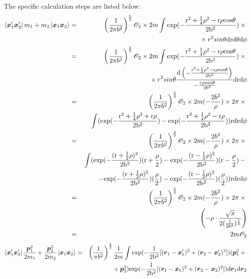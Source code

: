 \documentclass[11pt]{article}
\newcommand{\bm}[1]{\mbox{\boldmath{$#1$}}}
\begin{document}
\begin{enumerate}
\begin{enumerate}
The specific calculation steps are listed below:
\begin{eqnarray}
\bra{\bm{x}_{1}^\prime\bm{x}_{2}^\prime}m_{1}+m_{2}\ket{\bm{x}_{1}\bm{x}_{2}}&=&\left(\frac{1}{2\pi{}b^2}\right)^{\frac{3}{2}}
\mathscr{O}_2\times{}2m\int\rm{exp}(-\frac{r^2+\frac{1}{4}\rho^2-r{}\rho{}cos\theta}{2b^2})\times{}\nonumber\\
&&{}\times{}r^2sin\theta\rm{d}r\rm{d}\theta\rm{d}\phi\nonumber\\
&=&\left(\frac{1}{2\pi{}b^2}\right)^{\frac{3}{2}}\mathscr{O}_2\times{}2m
\int\rm{exp}(-\frac{r^2+\frac{1}{4}\rho^2-r{}\rho{}cos\theta}{2b^2})\times{}\nonumber\\
&&{}\times{}r^2sin\theta\frac{\rm{d}\left(-\frac{r^2+\frac{1}{4}\rho^2-r{}\rho{}cos\theta}{2b^2}\right)}
{-\frac{r{}\rho{}sin\theta}{2b^2}}
\rm{d}r\rm{d}\phi\nonumber\\
&=&\left(\frac{1}{2\pi{}b^2}\right)^{\frac{3}{2}}\mathscr{O}_2\times{}2m(-\frac{2b^2}{\rho})\times2\pi\times{}\nonumber\\
&&{}\int(\rm{exp}(-\frac{r^2+\frac{1}{4}\rho^2+r{}\rho}{2b^2})-\rm{exp}
(-\frac{r^2+\frac{1}{4}\rho^2-r{}\rho}{2b^2}))r\rm{d}r\rm{d}\phi\nonumber\\
&=&\left(\frac{1}{2\pi{}b^2}\right)^{\frac{3}{2}}\mathscr{O}_2\times{}2m(-\frac{2b^2}{\rho})\times2\pi\times{}\nonumber\\
&&{}\int(\rm{exp}(-\frac{(r+\frac{1}{2}\rho)^2}{2b^2})(r+\frac{\rho}{2})-\rm{exp}
(-\frac{(r-\frac{1}{2}\rho)^2}{2b^2})(r-\frac{\rho}{2})-{}\nonumber\\
&&-{}\rm{exp}(-\frac{(r+\frac{1}{2}\rho)^2}{2b^2})(\frac{\rho}{2})-
\rm{exp}(-\frac{(r-\frac{1}{2}\rho)^2}{2b^2})(\frac{\rho}{2}))
r\rm{d}r\rm{d}\phi\nonumber\\
&=&\left(\frac{1}{2\pi{}b^2}\right)^{\frac{3}{2}}\mathscr{O}_2\times{}2m(-\frac{2b^2}{\rho})\times{}2\pi\times{}\nonumber\\
&&\left(-\rho\cdot\frac{\sqrt{\pi}}{2(\frac{1}{2b^2})^{\frac{1}{2}}}\right)\nonumber\\
&=&2m\mathscr{O}_2
\end{eqnarray}
\begin{eqnarray}
\bra{\bm{x}_{1}^\prime\bm{x}_{2}^\prime}\frac{\bm{p}_{1}^2}{2m_{1}}+\frac{\bm{p}_{2}^2}{2m_{2}}\ket{\bm{x}_{1}\bm{x}_{2}}
&=&\left(\frac{1}{\pi{}b^2}\right)^{\frac{3}{2}}\frac{1}{2m}\int{}\rm{exp}(-\frac{1}{2b^2}[(\bm{r}_1-\bm{x}_{1}^{\prime})^2+
(\bm{r}_2-\bm{x}_{2}^{\prime})^2])(\bm{p}_{1}^2+{}\nonumber\\
&&{}+\bm{p}_{2}^2)
\rm{exp}(-\frac{1}{2b^2}[(\bm{r}_1-\bm{x}_{1})^2+(\bm{r}_2-\bm{x}_{2})^2])\rm{d}\bm{r}_1\rm{d}\bm{r}_2
\end{eqnarray}
\end{enumerate}
\end{enumerate}
\end{document}
